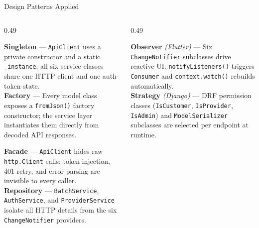 \documentclass[aspectratio=169,12pt]{beamer}
\begin{document}
\begin{frame}{Design Patterns Applied}
\vspace{0.06cm}
\begin{columns}[T]
\begin{column}{0.49\textwidth}

  \begin{tcolorbox}[cardbox,title={Creational Patterns (Flutter)}]
    \scriptsize
    \textbf{Singleton} --- \texttt{ApiClient} uses a private constructor and a static \texttt{\_instance}; all six service classes share one HTTP client and one auth-token state.\\[3pt]
    \textbf{Factory} --- Every model class exposes a \texttt{fromJson()} factory constructor; the service layer instantiates them directly from decoded API responses.
  \end{tcolorbox}

  \vspace{0.12cm}

  \begin{tcolorbox}[cardbox,title={Structural Patterns (Flutter)}]
    \scriptsize
    \textbf{Facade} --- \texttt{ApiClient} hides raw \texttt{http.Client} calls; token injection, 401 retry, and error parsing are invisible to every caller.\\[3pt]
    \textbf{Repository} --- \texttt{BatchService}, \texttt{AuthService}, and \texttt{ProviderService} isolate all HTTP details from the six \texttt{ChangeNotifier} providers.
  \end{tcolorbox}

\end{column}
\begin{column}{0.49\textwidth}

  \begin{tcolorbox}[orangecard,title={Behavioural Patterns}]
    \scriptsize
    \textbf{Observer} \textit{(Flutter)} --- Six \texttt{ChangeNotifier} subclasses drive reactive UI: \texttt{notifyListeners()} triggers \texttt{Consumer} and \texttt{context.watch()} rebuilds automatically.\\[3pt]
    \textbf{Strategy} \textit{(Django)} --- DRF permission classes (\texttt{IsCustomer}, \texttt{IsProvider}, \texttt{IsAdmin}) and \texttt{ModelSerializer} subclasses are selected per endpoint at runtime.
  \end{tcolorbox}

  \vspace{0.12cm}


\end{column}
\end{columns}
\end{frame}
\end{document}
